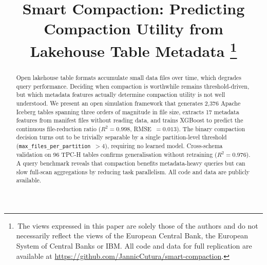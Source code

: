 \documentclass[conference, 10pt]{IEEEtran}
\newif\ifarxiv
\begin{document}
\title{Smart Compaction: Predicting Compaction Utility from Lakehouse Table Metadata\textsuperscript{}%
\thanks{\,The views expressed in this paper are solely those of the authors and do not necessarily reflect the views of the European Central Bank, the European System of Central Banks or IBM. All code and data for full replication are available at \url{https://github.com/JannicCutura/smart-compaction}.}
}

\author{
\and
{}
}

\maketitle

\renewcommand{\thefootnote}{\fnsymbol{footnote}}
\renewcommand{\thefootnote}{\arabic{footnote}}
\ifarxiv
{\let\thefootnote\relax\footnotetext{\copyright~2026 IEEE. Personal use of
this material is permitted. Permission from IEEE must be obtained for all
other uses, in any current or future media, including reprinting/republishing
this material for advertising or promotional purposes, creating new collective
works, for resale or redistribution to servers or lists, or reuse of any
copyrighted component of this work in other works.}}
\fi

\begin{abstract}
Open lakehouse table formats accumulate small data files over time,
which degrades query performance. Deciding when compaction is worthwhile
remains threshold-driven, but which metadata features actually determine
compaction utility is not well understood. We present an open simulation
framework that generates 2{,}376 Apache Iceberg tables spanning three
orders of magnitude in file size, extracts 17 metadata features from
manifest files without reading data, and trains XGBoost to predict the
continuous file-reduction ratio ($R^2 = 0.998$, RMSE~$= 0.013$). The
binary compaction decision turns out to be trivially separable by a
single partition-level threshold
(\texttt{max\_files\_per\_partition}~$> 4$), requiring no learned model.
Cross-schema validation on 96 TPC-H tables confirms generalisation
without retraining ($R^2 = 0.976$). A query benchmark reveals that
compaction benefits metadata-heavy queries but can slow full-scan
aggregations by reducing task parallelism.
All code and data are publicly available.
\end{abstract}
\end{document}
